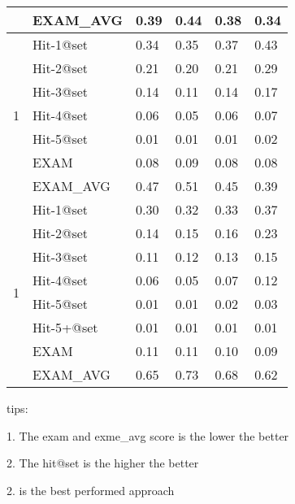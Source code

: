 \begin{table}[h]
{\begin{center}
\begin{tabular}{p{0.5cm}<{\centering}|p{1.5cm}<{\centering}|p{1cm}<{\centering}|p{0.8cm}<{\centering}|p{1.2cm}<{\centering}|p{1.2cm}<{\centering}}
									& EXAM\_AVG     & 0.39 & 0.44 & 0.38 & 0.34 \\
				\hline
				\multirow{7}{*}{1}  & Hit-1@set     & 0.34 & 0.35 & 0.37 & 0.43 \\
									& Hit-2@set     & 0.21 & 0.20 & 0.21 & 0.29 \\
									& Hit-3@set     & 0.14 & 0.11 & 0.14 & 0.17 \\
									& Hit-4@set     & 0.06 & 0.05 & 0.06 & 0.07 \\
									& Hit-5@set     & 0.01 & 0.01 & 0.01 & 0.02 \\
									& EXAM          & 0.08 & 0.09 & 0.08 & 0.08 \\
									& EXAM\_AVG     & 0.47 & 0.51 & 0.45 & 0.39 \\
				\hline
				\multirow{8}{*}{1}  & Hit-1@set     & 0.30 & 0.32 & 0.33 & 0.37 \\
									& Hit-2@set     & 0.14 & 0.15 & 0.16 & 0.23 \\
									& Hit-3@set     & 0.11 & 0.12 & 0.13 & 0.15 \\
									& Hit-4@set     & 0.06 & 0.05 & 0.07 & 0.12 \\
									& Hit-5@set     & 0.01 & 0.01 & 0.02 & 0.03 \\
									& Hit-5+@set    & 0.01 & 0.01 & 0.01 & 0.01 \\
									& EXAM          & 0.11 & 0.11 & 0.10 & 0.09 \\
									& EXAM\_AVG     & 0.65 & 0.73 & 0.68 & 0.62 \\
				\hline
			\end{tabular}
			
			\label{fig:rq1-1}
		\end{center}
	}
\end{table}

tips:

1. The exam and exme\_avg score is the lower the better

2. The hit@set is the higher the better

2. \tool is the best performed approach

